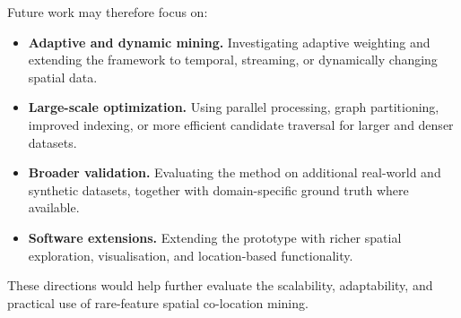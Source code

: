 \documentclass[12pt, letterpaper]{template}
\theoremstyle{definition}
\begin{document}
Future work may therefore focus on:

\begin{itemize}

\item \textbf{Adaptive and dynamic mining.}
Investigating adaptive weighting and extending the framework to temporal,
streaming, or dynamically changing spatial data.

\item \textbf{Large-scale optimization.}
Using parallel processing, graph partitioning, improved indexing, or more
efficient candidate traversal for larger and denser datasets.

\item \textbf{Broader validation.}
Evaluating the method on additional real-world and synthetic datasets, together
with domain-specific ground truth where available.

\item \textbf{Software extensions.}
Extending the prototype with richer spatial exploration, visualisation, and
location-based functionality.

\end{itemize}

These directions would help further evaluate the scalability, adaptability, and
practical use of rare-feature spatial co-location mining.







\appendix
\end{document}
